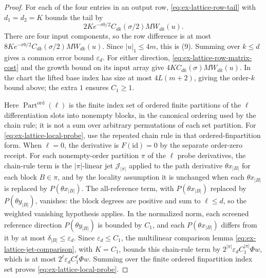\begin{proof}
For each of the four entries in an output row, \eqref{eq:ex-lattice-row-tail} with
\(d_1=d_2=K\) bounds the tail by
\[
 2K e^{-\sigma b/2}C_{dk}(\sigma/2)M W_{dk}(u).
\]
There are four input components, so the row difference is at most
\(8K e^{-\sigma b/2}C_{dk}(\sigma/2)M W_{dk}(u)\).
Since \(|u|_1\le4m\), this is (9). Summing over \(k\le d\) gives a
common error bound \(\varepsilon_d\). For either direction, \eqref{eq:ex-lattice-row-matrix-cost} and the
growth bound on its input array give
\(4K C_{dk}(\sigma)M W_{dk}(u)\). In the chart the lifted base index has
size at most \(4L(m+2)\), giving the order-\(k\) bound above; the extra
\(1\) ensures \(C_1\ge1\).

Here \(\operatorname{Part}^{\mathrm{ord}}(\ell)\) is the finite index set of
ordered finite partitions of the \(\ell\) differentiation slots into
nonempty blocks, in the canonical ordering used by the chain rule; it is
not a sum over arbitrary permutations of each set partition. For \eqref{eq:ex-lattice-local-probe}, use
the repeated chain rule in that ordered-finpartition form. When \(\ell=0\),
the derivative is \(F(\mathrm{id})=0\) by the separate order-zero receipt.
For each nonempty-order partition \(\pi\) of the \(\ell\) probe derivatives, the
chain-rule term is the \(|\pi|\)-linear jet \(\mathcal J_{|\pi|}\) applied
to the path derivative \(\theta x_{|B|}\) for each block \(B\in\pi\),
and by the locality assumption it is unchanged when each
\(\theta x_{|B|}\) is replaced by \(P(\theta x_{|B|})\).
The all-reference term, with \(P(\theta x_{|B|})\) replaced by
\(P(\theta y_{|B|})\), vanishes:
the block degrees are positive and sum to \(\ell\le d\), so the weighted
vanishing hypothesis applies. In the normalized norm, each screened
reference direction \(P(\theta y_{|B|})\) is bounded by
\(C_1\), and each \(P(\theta x_{|B|})\) differs from it by at most
\(\delta_{|B|}\le\varepsilon_d\). Since \(\varepsilon_d\le C_1\), the multilinear
comparison lemma \eqref{eq:ex-lattice-jet-comparison}, with \(K=C_1\), bounds this chain-rule term by
\(2^{|\pi|}\varepsilon_d C_1^{|\pi|}\Phi w\), which is at most
\(2^\ell\varepsilon_d C_1^\ell\Phi w\). Summing over the finite ordered
finpartition index set proves \eqref{eq:ex-lattice-local-probe}.
\end{proof}

